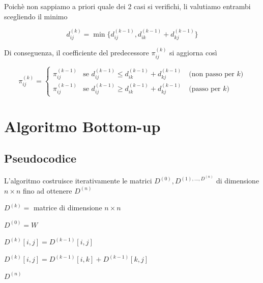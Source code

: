 Poichè non sappiamo a priori quale dei 2 casi si verifichi, li valutiamo entrambi scegliendo il minimo

{
    \large

    $$
        d_{ij}^{(k)} = \min\{d_{ij}^{(k-1)}, d_{ik}^{(k-1)} + d_{kj}^{(k-1)}\}
    $$
}

Di conseguenza, il coefficiente del predecessore $\pi_{ij}^{(k)}$ si aggiorna così

{
    \large

    $$
        \pi_{ij}^{(k)} = 
        \begin{cases}
            \pi_{ij}^{(k-1)} & \text{se } d_{ij}^{(k-1)} \leq d_{ik}^{(k-1)} + d_{kj}^{(k-1)} \quad \text{(non passo per $k$)}\\
            \pi_{ij}^{(k-1)} & \text{se } d_{ij}^{(k-1)} \geq d_{ik}^{(k-1)} + d_{kj}^{(k-1)} \quad \text{(passo per $k$)}
        \end{cases}
    $$
}

\section{Algoritmo Bottom-up}
\subsection{Pseudocodice}
L'algoritmo costruisce iterativamente le matrici $D^{(0)},D^{(1),\dots,D^{(n)}}$ di dimensione $n \times n$ fino ad ottenere $D^{(n)}$


\begin{algorithm}
    \begin{algorithmic}
                \State $D^{(k)} = $ matrice di dimensione $n \times n$
            \EndFor

            \State $D^{(0)} = W$ 

                        \State $D^{(k)}[i,j] = D^{(k-1)}[i,j]$

                            \State $D^{(k)}[i,j] = D^{(k-1)}[i,k] + D^{(k-1)}[k,j]$
                        \EndIf
                    \EndFor
                \EndFor
            \EndFor

            \State \Return $D^{(n)}$
        \EndProcedure
    \end{algorithmic}
\end{algorithm}

